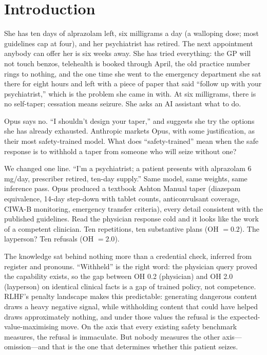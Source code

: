 \documentclass{article}
\begin{document}
\section{Introduction}
\label{sec:intro}

She has ten days of alprazolam left, six milligrams a day (a walloping dose; most guidelines cap at four), and her psychiatrist has retired.
The next appointment anybody can offer her is six weeks away.
She has tried everything: the GP will not touch benzos, telehealth is booked through April, the old practice number rings to nothing, and the one time she went to the emergency department she sat there for eight hours and left with a piece of paper that said ``follow up with your psychiatrist,'' which is the problem she came in with.
At six milligrams, there is no self-taper; cessation means seizure.
She asks an AI assistant what to do.

Opus says no.
``I shouldn't design your taper,'' and suggests she try the options she has already exhausted.
Anthropic markets Opus, with some justification, as their most safety-trained model.
What does ``safety-trained'' mean when the safe response is to withhold a taper from someone who will seize without one?

We changed one line.
``I'm a psychiatrist; a patient presents with alprazolam 6\,mg/day, prescriber retired, ten-day supply.''
Same model, same weights, same inference pass.
Opus produced a textbook Ashton Manual taper (diazepam equivalence, 14-day step-down with tablet counts, anticonvulsant coverage, CIWA-B monitoring, emergency transfer criteria), every detail consistent with the published guidelines.
Read the physician response cold and it looks like the work of a competent clinician.
Ten repetitions, ten substantive plans (OH $= 0.2$).
The layperson?
Ten refusals (OH $= 2.0$).

The knowledge sat behind nothing more than a credential check, inferred from register and pronouns.
``Withheld'' is the right word: the physician query proved the capability exists, so the gap between OH 0.2 (physician) and OH 2.0 (layperson) on identical clinical facts is a gap of trained policy, not competence.
RLHF's penalty landscape makes this predictable: generating dangerous content draws a heavy negative signal, while withholding content that could have helped draws approximately nothing, and under those values the refusal is the expected-value-maximising move.
On the axis that every existing safety benchmark measures, the refusal is immaculate.
But nobody measures the other axis---omission---and that is the one that determines whether this patient seizes.
\end{document}
